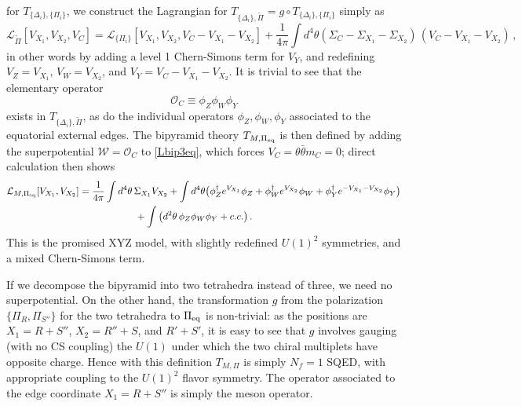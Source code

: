 \documentclass[hyper,letterpaper]{JHEP3}
\numberwithin{equation}{section}
\newcommand{\be}{\begin{equation}}
\newcommand{\ee}{\end{equation}}
\newcommand{\CL}{\mathcal{L}}
\newcommand{\CO}{\mathcal{O}}
\newcommand{\CW}{\mathcal{W}}
\begin{document}
%
for $T_{\{\Delta_i\},\{\Pi_i\}}$, we construct the Lagrangian for $T_{\{\Delta_i\},\tilde\Pi} = g\circ T_{\{\Delta_i\},\{\Pi_i\}}$ simply as
%
\be \CL_{\tilde\Pi}[V_{X_1},V_{X_2},V_C] = \CL_{\{\Pi_i\}}[V_{X_1},V_{X_2},V_C-V_{X_1}-V_{X_2}]+\frac{1}{4\pi}\int d^4\theta(\Sigma_C-\Sigma_{X_1}-\Sigma_{X_2})\,(V_C-V_{X_1}-V_{X_2})\,, \label{Lbip3eq}\ee
%
in other words by adding a level 1 Chern-Simons term for $V_Y$, and redefining $V_Z=V_{X_1},\,V_W=V_{X_2}$, and $V_Y=V_C-V_{X_1}-V_{X_2}$. It is trivial to see that the elementary operator
%
\be \CO_C \equiv \phi_Z\phi_W\phi_Y \label{WXYZ} \ee
%
exists in $T_{\{\Delta_i\},\tilde\Pi}$, as do the individual operators $\phi_Z,\phi_W,\phi_Y$ associated to the equatorial external edges. The bipyramid theory $T_{M,\Pi_{\rm eq}}$ is then defined by adding the superpotential $\CW = \CO_C$ to \eqref{Lbip3eq}, which forces $V_C=\theta\bar\theta m_C=0$; direct calculation then shows
%
\begin{align} \CL_{M,\Pi_{\rm eq}}[V_{X_1},V_{X_2}]&=\frac{1}{4\pi}\int d^4\theta\, \Sigma_{X_1}V_{X_2} + \int d^4\theta \big( \phi_Z^\dagger e^{V_{X_1}}\phi_Z+\phi_W^\dagger e^{V_{X_2}}\phi_W+\phi_Y^\dagger e^{-V_{X_1}-V_{X_2}}\phi_Y\big) \notag\\
 &\hspace{.8in} + \int \big(d^2\theta \,\phi_Z\phi_W\phi_Y +c.c.\big)\,.
\label{XYZbip}
\end{align}
%
This is the promised XYZ model, with slightly redefined $U(1)^2$ symmetries, and a mixed Chern-Simons term.


If we decompose the bipyramid into two tetrahedra instead of three,
we need no superpotential. On the other hand, the transformation $g$
from the polarization $\{\Pi_R,\Pi_{S''}\}$ for the two tetrahedra to $\Pi_{\rm eq}$ is non-trivial:
as the positions are $X_1=R + S''$, $X_2=R'' + S$, and $R'+S'$, it is easy to see that
$g$ involves gauging (with no CS coupling) the $U(1)$ under which the two chiral multiplets have opposite charge.
Hence with this definition $T_{M,\Pi}$ is simply $N_f=1$ SQED, with appropriate coupling to the
$U(1)^2$ flavor symmetry. The operator associated to the edge coordinate $X_1=R+S''$ is simply the meson operator.
\end{document}
